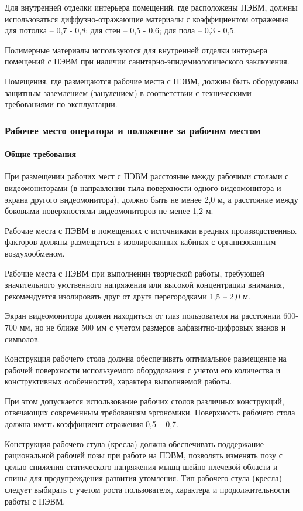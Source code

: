 Для внутренней отделки интерьера помещений, где расположены ПЭВМ, должны использоваться диффузно-отражающие материалы с коэффициентом отражения для потолка – 0,7 - 0,8; для стен – 0,5 - 0,6; для пола – 0,3 - 0,5.

Полимерные материалы используются для внутренней отделки интерьера помещений с ПЭВМ при наличии санитарно-эпидемиологического заключения.

Помещения, где размещаются рабочие места с ПЭВМ, должны быть оборудованы защитным заземлением (занулением) в соответствии с техническими требованиями по эксплуатации.

\subsubsection{Рабочее место оператора и положение за рабочим местом}
\paragraph{Общие требования}

При размещении рабочих мест с ПЭВМ расстояние между рабочими столами с видеомониторами (в направлении тыла поверхности одного видеомонитора и экрана другого видеомонитора), должно быть не менее 2,0 м, а расстояние между боковыми поверхностями видеомониторов не менее 1,2 м.

Рабочие места с ПЭВМ в помещениях с источниками вредных производственных факторов должны размещаться в изолированных кабинах с организованным воздухообменом. 

Рабочие места с ПЭВМ при выполнении творческой работы, требующей значительного умственного напряжения или высокой концентрации внимания, рекомендуется изолировать друг от друга перегородками 1,5 – 2,0 м.

Экран видеомонитора должен находиться от глаз пользователя на расстоянии 600-700 мм, но не ближе 500 мм с учетом размеров алфавитно-цифровых знаков и символов.

Конструкция рабочего стола должна обеспечивать оптимальное размещение на рабочей поверхности используемого оборудования с учетом его количества и конструктивных особенностей, характера выполняемой работы.

При этом допускается использование рабочих столов различных конструкций, отвечающих современным требованиям эргономики. Поверхность рабочего стола должна иметь коэффициент отражения 0,5 – 0,7.

Конструкция рабочего стула (кресла) должна обеспечивать поддержание рациональной рабочей позы при работе на ПЭВМ, позволять изменять позу с целью снижения статического напряжения мышц шейно-плечевой области и спины для предупреждения развития утомления. Тип рабочего стула (кресла) следует выбирать с учетом роста пользователя, характера и продолжительности работы с ПЭВМ.


